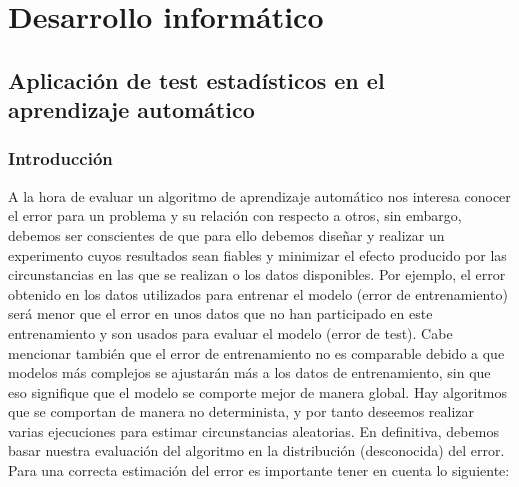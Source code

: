 %
%

\chapter{Desarrollo informático}

\section{Aplicación de test estadísticos en el aprendizaje automático}

\subsection{Introducción}

	A la hora de evaluar un algoritmo de aprendizaje 
automático nos interesa conocer el error para un problema y 
su relación con respecto a otros, sin embargo, debemos ser 
conscientes de que para ello debemos diseñar y realizar un 
experimento cuyos resultados sean fiables y minimizar el 
efecto producido por las circunstancias en las que se 
realizan o los datos disponibles. Por ejemplo, el error 
obtenido en los datos utilizados para entrenar el modelo 
(error de entrenamiento) será menor que el error en unos 
datos que no han participado en este entrenamiento y son 
usados para evaluar el modelo (error de test). Cabe mencionar 
también que el error de entrenamiento no es comparable debido 
a que modelos más complejos se ajustarán más a los datos de 
entrenamiento, sin que eso signifique que el modelo se 
comporte mejor de manera global. Hay algoritmos que se 
comportan de manera no determinista, y por tanto deseemos 
realizar varias ejecuciones para estimar circunstancias 
aleatorias. En definitiva, debemos basar nuestra evaluación 
del algoritmo en la distribución (desconocida) del error. 
Para una correcta estimación del error es importante tener en 
cuenta lo siguiente:
	
